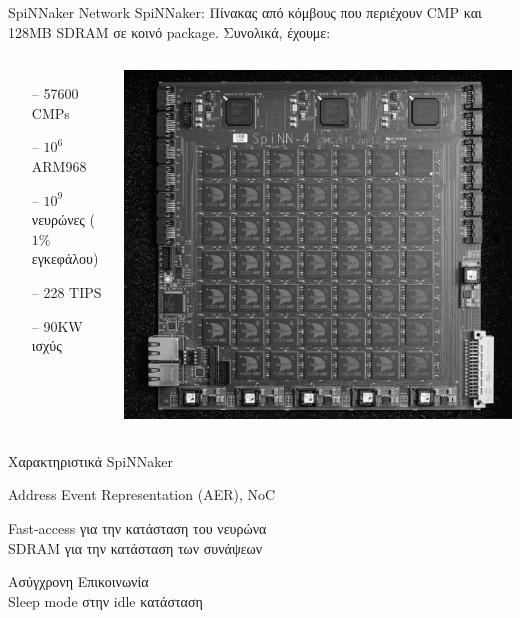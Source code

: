 \documentclass[11pt,center]{beamer}
\begin{document}
	\begin{frame}{SpiNNaker Network}
		SpiNNaker: Πίνακας από κόμβους που περιέχουν CMP και 128MB SDRAM σε κοινό package.
		\pause
		\vfill
		Συνολικά, έχουμε:
		\begin{columns}
				\begin{itemize}
					\item[--] 57600 CMPs
					\item[--] $10^6$ ARM968
					\item[--] $10^{9}$ νευρώνες ($1 \%$ εγκεφάλου)
					\item[--] 228 TIPS
					\item[--] 90KW ισχύς
				\end{itemize}
				\includegraphics[width=0.9 \textwidth,left]{../pics/Spinnaker.jpg}
		\end{columns}
	\end{frame}

	\begin{frame}{Χαρακτηριστικά SpiNNaker}
		\begin{description}
			  \item[Επικοινωνία] Address Event Representation (AER), NoC
			  \pause
			  \vfill
			  \item[Μνήμη] Fast-access για την κατάσταση του νευρώνα\\
			  SDRAM για την κατάσταση των συνάψεων
			  \pause
			  \vfill
			  \item[Κατανάλωση] Ασύγχρονη Επικοινωνία\\
			  Sleep mode στην idle κατάσταση \\
		\end{description}
	\end{frame}
\end{document}

